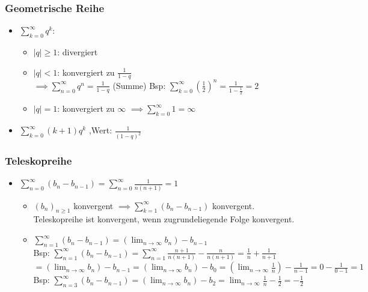\documentclass[a4paper]{article}
\def\limn{\lim_{n\to \infty}}
\def\sumk{\sum_{k=1}^\infty}
\def\sumn{\sum_{n=0}^\infty}
\begin{document}
\subsubsection{Geometrische Reihe}
\begin{itemize}[leftmargin=4.5mm, topsep=1pt, parsep=1pt]
  \item $\sum_{k=0}^\infty q^k$: \\
  \begin{itemize}[leftmargin=4.5mm, topsep=1pt, parsep=1pt]
    \item $|q| \ge 1$: divergiert \\ 
    \item $|q| < 1$: konvergiert zu $\frac{1}{1 - q}$\\ 
            \qquad $\implies \sum_{n = 0}^{\infty} q^n = \frac{1}{1-q}$ (Summe)
            \tiny \color{gray}
              Bsp: $\sum_{k=0}^{\infty} (\frac{1}{2})^n = \frac{1}{1-\frac{1}{2}} = 2$ \\
            \normalsize \color{black}
    \item $|q| = 1$: konvergiert zu $\infty$ $\implies \sum_{k=0}^\infty 1 = \infty$
  \end{itemize}

\item $\sum_{k=0}^{\infty} (k+1)q^k$ ,Wert: $\frac{1}{(1-q)^2}$
\end{itemize}

\subsubsection{Teleskopreihe}
\begin{itemize}[leftmargin=4.5mm, topsep=1pt, parsep=1pt]
  \item $\sumn (b_n - b_{n-1}) = \sumn \frac{1}{n(n+1)} = 1$ \\
        \begin{itemize}[leftmargin=4.5mm, topsep=1pt, parsep=1pt]
          \item $(b_n)_{n \geqslant 1}$ konvergent $\implies \sumk (b_n - b_{n-1})$ konvergent. \\
            \tiny \color{gray}
              Teleskopreihe ist konvergent, wenn zugrundeliegende Folge konvergent.
            \normalsize \color{black}
          \item $\sum_{n = 1}^{\infty} (b_n - b_{n-1}) = (\limn b_n) - b_{n-1}$ \\
            \tiny \color{gray}
              Bsp: $\sum_{n = 1}^{\infty} (b_n - b_{n-1}) = \sum_{n = 1}^{\infty} \frac{n+1}{n(n+1)} - \frac{n}{n(n+1)} = \frac{1}{n} + \frac{1}{n+1}$ \\ 
                    $= (\limn b_n) - b_{n-1} = (\limn b_n) - b_0 = (\limn \frac{1}{n}) - \frac{1}{n-1} = 0 - \frac{1}{0-1} = 1$ \\
              Bsp: $\sum_{n = 3}^{\infty} (b_n - b_{n-1}) = (\limn b_n) - b_2 = \limn \frac{1}{n} - \frac{1}{2} = -\frac{1}{2}$ \\
            \normalsize \color{black}
          \end{itemize}
\end{itemize}
               
\end{document}
